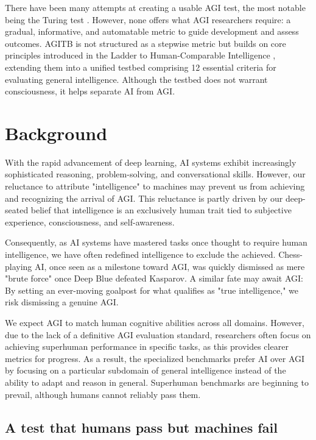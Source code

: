 \documentclass{article}
\begin{document}
There have been many attempts at creating a usable AGI test, the most notable being the Turing test \cite{Turing1950}. However, none offers what AGI researchers require: a gradual, informative, and automatable metric to guide development and assess outcomes. AGITB is not structured as a stepwise metric but builds on core principles introduced in the Ladder to Human-Comparable Intelligence \cite{Sprogar2018}, extending them into a unified testbed comprising 12 essential criteria for evaluating general intelligence. Although the testbed does not warrant consciousness, it helps separate AI from AGI.


\section{Background}

With the rapid advancement of deep learning, AI systems exhibit increasingly sophisticated reasoning, problem-solving, and conversational skills. However, our reluctance to attribute "intelligence" to machines may prevent us from achieving and recognizing the arrival of AGI. This reluctance is partly driven by our deep-seated belief that intelligence is an exclusively human trait tied to subjective experience, consciousness, and self-awareness. 

Consequently, as AI systems have mastered tasks once thought to require human intelligence, we have often redefined intelligence to exclude the achieved. Chess-playing AI, once seen as a milestone toward AGI, was quickly dismissed as mere "brute force" once Deep Blue defeated Kasparov. A similar fate may await AGI: By setting an ever-moving goalpost for what qualifies as "true intelligence," we risk dismissing a genuine AGI. 

We expect AGI to match human cognitive abilities across all domains. However, due to the lack of a definitive AGI evaluation standard, researchers often focus on achieving superhuman performance in specific tasks, as this provides clearer metrics for progress. As a result, the specialized benchmarks prefer AI over AGI by focusing on a particular subdomain of general intelligence instead of the ability to adapt and reason in general. Superhuman benchmarks are beginning to prevail, although humans cannot reliably pass them.

\subsection{A test that humans pass but machines fail}
\end{document}
